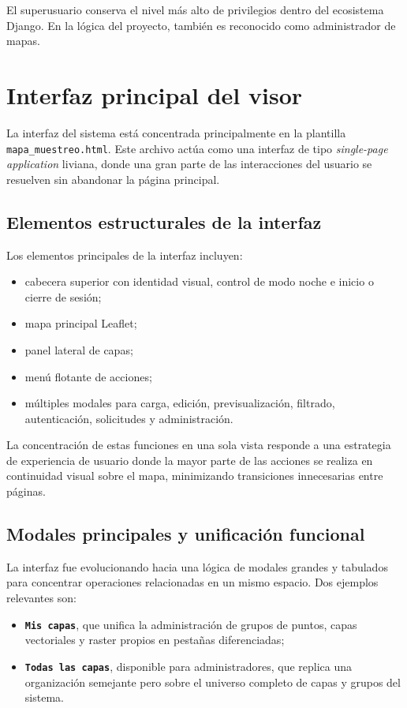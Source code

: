 \documentclass[12pt,a4paper]{report}
\begin{document}
El superusuario conserva el nivel m\'as alto de privilegios dentro del ecosistema Django. En la l\'ogica del proyecto, tambi\'en es reconocido como administrador de mapas.

\section{Interfaz principal del visor}

La interfaz del sistema est\'a concentrada principalmente en la plantilla \texttt{mapa\_muestreo.html}. Este archivo act\'ua como una interfaz de tipo \emph{single-page application} liviana, donde una gran parte de las interacciones del usuario se resuelven sin abandonar la p\'agina principal.

\subsection{Elementos estructurales de la interfaz}

Los elementos principales de la interfaz incluyen:

\begin{itemize}
    \item cabecera superior con identidad visual, control de modo noche e inicio o cierre de sesi\'on;
    \item mapa principal Leaflet;
    \item panel lateral de capas;
    \item men\'u flotante de acciones;
    \item m\'ultiples modales para carga, edici\'on, previsualizaci\'on, filtrado, autenticaci\'on, solicitudes y administraci\'on.
\end{itemize}

La concentraci\'on de estas funciones en una sola vista responde a una estrategia de experiencia de usuario donde la mayor parte de las acciones se realiza en continuidad visual sobre el mapa, minimizando transiciones innecesarias entre p\'aginas.

\subsection{Modales principales y unificaci\'on funcional}

La interfaz fue evolucionando hacia una l\'ogica de modales grandes y tabulados para concentrar operaciones relacionadas en un mismo espacio. Dos ejemplos relevantes son:

\begin{itemize}
    \item \textbf{\texttt{Mis capas}}, que unifica la administraci\'on de grupos de puntos, capas vectoriales y raster propios en pesta\~nas diferenciadas;
    \item \textbf{\texttt{Todas las capas}}, disponible para administradores, que replica una organizaci\'on semejante pero sobre el universo completo de capas y grupos del sistema.
\end{itemize}
\end{document}
